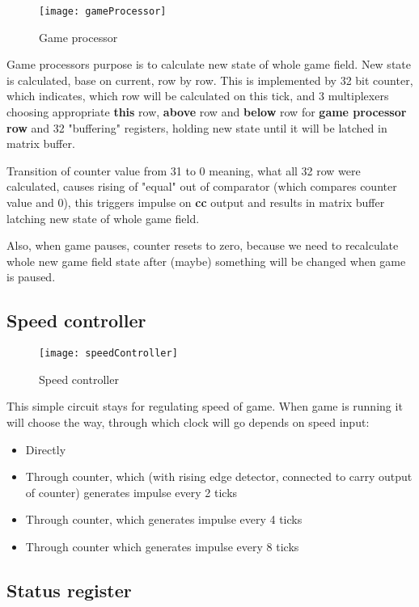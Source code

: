 \begin{figure}[ht]
	\centering
	\texttt{[image: gameProcessor]}
	\caption{Game processor}
\end{figure}

Game processors purpose is to calculate new state of whole game field. New state is calculated, base on current, row by row. This is implemented by 32 bit counter, which indicates, which row will be calculated on this tick, and 3 multiplexers choosing appropriate \textbf{this} row, \textbf{above} row and \textbf{below} row for \textbf{game processor row} and 32 "buffering" registers, holding new state until it will be latched in matrix buffer.

Transition of counter value from 31 to 0 meaning, what all 32 row were calculated, causes rising of "equal" out of comparator (which compares counter value and 0), this triggers impulse on \textbf{cc} output and results in matrix buffer latching new state of whole game field.

Also, when game pauses, counter resets to zero, because we need to recalculate whole new game field state after (maybe) something will be changed when game is paused. 

\clearpage
\subsection*{Speed controller}

\begin{figure}[ht]
	\centering
	\texttt{[image: speedController]}
	\caption{Speed controller}
\end{figure}

This simple circuit stays for regulating speed of game. When game is running it will choose the way, through which clock will go depends on speed input:

\begin{itemize}
	\item Directly 
	\item Through counter, which (with rising edge detector, connected to carry output of counter) generates impulse every 2 ticks
	\item Through counter, which generates impulse every 4 ticks
	\item Through counter which generates impulse every 8 ticks
\end{itemize}

\subsection*{Status register}

